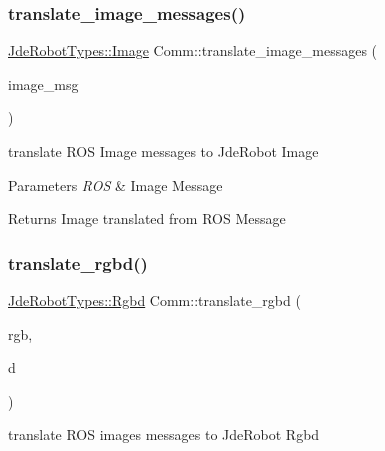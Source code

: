 \mbox{\label{namespace_comm_ad9eade500ada9cd99a62086a53986e36}} 
\subsubsection{\texorpdfstring{translate\+\_\+image\+\_\+messages()}{translate\_image\_messages()}}
{\footnotesize\ttfamily \hyperlink{class_jde_robot_types_1_1_image}{Jde\+Robot\+Types\+::\+Image} Comm\+::translate\+\_\+image\+\_\+messages (\begin{DoxyParamCaption}\item[{const sensor\+\_\+msgs\+::\+Image\+Const\+Ptr \&}]{image\+\_\+msg }\end{DoxyParamCaption})}



translate R\+OS Image messages to Jde\+Robot Image 


\begin{DoxyParams}{Parameters}
{\em R\+OS} & Image Message\\
\hline
\end{DoxyParams}
\begin{DoxyReturn}{Returns}
Image translated from R\+OS Message 
\end{DoxyReturn}
\mbox{\label{namespace_comm_a7e4e8f50789805802aea4d68670a495c}} 
\subsubsection{\texorpdfstring{translate\+\_\+rgbd()}{translate\_rgbd()}}
{\footnotesize\ttfamily \hyperlink{class_jde_robot_types_1_1_rgbd}{Jde\+Robot\+Types\+::\+Rgbd} Comm\+::translate\+\_\+rgbd (\begin{DoxyParamCaption}\item[{const sensor\+\_\+msgs\+::\+Image\+Const\+Ptr \&}]{rgb,  }\item[{const sensor\+\_\+msgs\+::\+Image\+Const\+Ptr \&}]{d }\end{DoxyParamCaption})}



translate R\+OS images messages to Jde\+Robot Rgbd 


